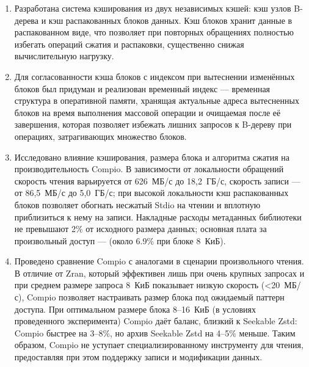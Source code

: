\begin{enumerate}
    \item Разработана система кэширования из двух независимых кэшей: кэш узлов B-дерева и кэш распакованных блоков данных. Кэш блоков хранит данные в распакованном виде, что позволяет при повторных обращениях полностью избегать операций сжатия и распаковки, существенно снижая вычислительную нагрузку.

    \item Для согласованности кэша блоков с индексом при вытеснении изменённых блоков был придуман и реализован временный индекс --- временная структура в оперативной памяти, хранящая актуальные адреса вытесненных блоков на время выполнения массовой операции и очищаемая после её завершения, которая позволяет избежать лишних запросов к B-дереву при операциях, затрагивающих множество блоков.

    \item Исследовано влияние кэширования, размера блока и алгоритма сжатия на производительность Compio. В зависимости от локальности обращений скорость чтения варьируется от 626~МБ/с до 18,2~ГБ/с, скорость записи — от 86,5~МБ/с до 5,0~ГБ/с; при высокой локальности кэш распакованных блоков позволяет обогнать несжатый Stdio на чтении и вплотную приблизиться к нему на записи. Накладные расходы метаданных библиотеки не превышают 2\% от исходного размера данных; основная плата за произвольный доступ ---  (около 6.9\% при блоке 8~КиБ).

    \item Проведено сравнение Compio с аналогами в сценарии произвольного чтения. В отличие от Zran, который эффективен лишь при очень крупных запросах и при среднем размере запроса 8~КиБ показывает низкую скорость (<20~МБ/с), Compio позволяет настраивать размер блока под ожидаемый паттерн доступа. При оптимальном размере блока 8--16~КиБ (в условиях проведенного эксперимента) Compio даёт баланс, близкий к Seekable Zstd: Compio быстрее на 3--8\%, но архив Seekable Zstd на 4--5\% меньше. Таким образом, Compio не уступает специализированному инструменту для чтения, предоставляя при этом поддержку записи и модификации данных.
\end{enumerate}

